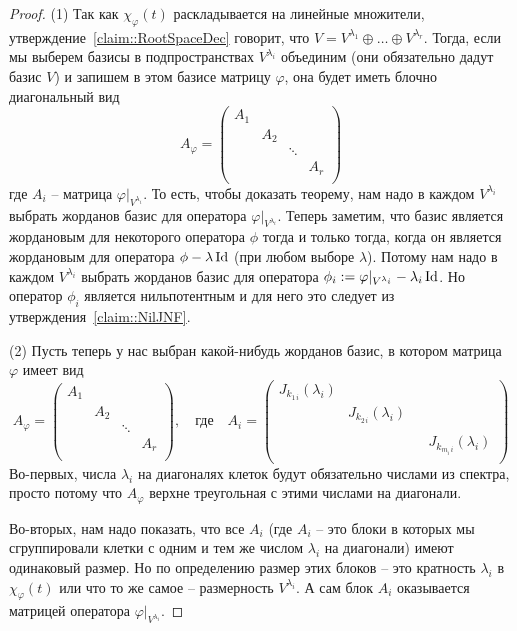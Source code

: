 \begin{proof}
(1) Так как $\chi_\varphi(t)$ раскладывается на линейные множители, утверждение~\ref{claim::RootSpaceDec} говорит, что $V = V^{\lambda_1}\oplus \ldots\oplus V^{\lambda_r}$. Тогда, если мы выберем базисы в подпространствах $V^{\lambda_i}$ объединим (они обязательно дадут базис $V$) и запишем в этом базисе матрицу $\varphi$, она будет иметь блочно диагональный вид
\[
A_\varphi = 
\begin{pmatrix}
{A_1}&{}&{}&{}\\
{}&{A_2}&{}&{}\\
{}&{}&{\ddots}&{}\\
{}&{}&{}&{A_r}\\
\end{pmatrix}
\]
где $A_i$ -- матрица $\varphi|_{V^{\lambda_i}}$. То есть, чтобы доказать теорему, нам надо в каждом $V^{\lambda_i}$ выбрать жорданов базис для оператора $\varphi|_{V^{\lambda_i}}$. Теперь заметим, что базис является жордановым для некоторого оператора $\phi$ тогда и только тогда, когда он является жордановым для оператора $\phi - \lambda \operatorname{Id}$ (при любом выборе $\lambda$). Потому нам надо в каждом $V^{\lambda_i}$ выбрать жорданов базис для оператора $\phi_i := \varphi|_{V^{\lambda_i}} - \lambda_i \operatorname{Id}$. Но оператор $\phi_i$ является нильпотентным и для него это следует из утверждения~\ref{claim::NilJNF}.

(2) Пусть теперь у нас выбран какой-нибудь жорданов базис, в котором матрица $\varphi$ имеет вид
\[
A_\varphi = 
\begin{pmatrix}
{A_1}&{}&{}&{}\\
{}&{A_2}&{}&{}\\
{}&{}&{\ddots}&{}\\
{}&{}&{}&{A_r}\\
\end{pmatrix},
\quad\text{где}\quad
A_i = 
\begin{pmatrix}
{J_{k_{1\,i}}(\lambda_i)}&{}&{}&{}\\
{}&{J_{k_{2\,i}}(\lambda_i)}&{}&{}\\
{}&{}&{}&{}\\
{}&{}&{}&{J_{k_{m_i\,i}}(\lambda_i)}\\
\end{pmatrix}
\]
Во-первых, числа $\lambda_i$ на диагоналях клеток будут обязательно числами из спектра, просто потому что $A_\varphi$ верхне треугольная с этими числами на диагонали.

Во-вторых, нам надо показать, что все $A_i$ (где $A_i$ -- это блоки в которых мы сгруппировали клетки с одним и тем же числом $\lambda_i$ на диагонали) имеют одинаковый размер. Но по определению размер этих блоков -- это кратность $\lambda_i$ в $\chi_\varphi(t)$ или что то же самое -- размерность $V^{\lambda_i}$. А сам блок $A_i$ оказывается матрицей оператора $\varphi|_{V^{\lambda_i}}$.


\end{proof}
